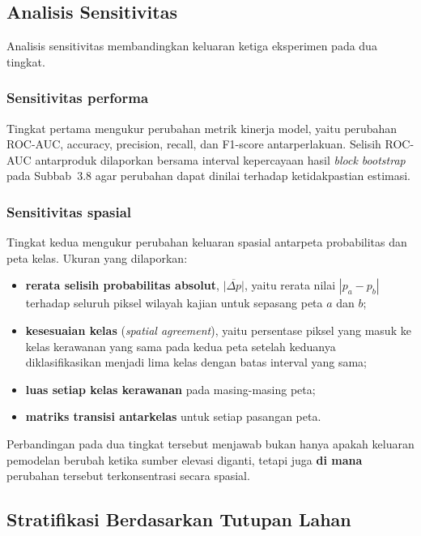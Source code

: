 \documentclass[12pt]{article}
\begin{document}
\subsection{Analisis Sensitivitas}

Analisis sensitivitas membandingkan keluaran ketiga eksperimen pada dua
tingkat.

\subsubsection{Sensitivitas performa}

Tingkat pertama mengukur perubahan metrik kinerja model, yaitu perubahan
ROC-AUC, accuracy, precision, recall, dan F1-score antarperlakuan. Selisih
ROC-AUC antarproduk dilaporkan bersama interval kepercayaan hasil
\textit{block bootstrap} pada Subbab~3.8 agar perubahan dapat dinilai
terhadap ketidakpastian estimasi.

\subsubsection{Sensitivitas spasial}

Tingkat kedua mengukur perubahan keluaran spasial antarpeta probabilitas dan
peta kelas. Ukuran yang dilaporkan:

\begin{itemize}
\item \textbf{rerata selisih probabilitas absolut}, $\overline{|\Delta p|}$,
yaitu rerata nilai $|p_a - p_b|$ terhadap seluruh piksel wilayah kajian
untuk sepasang peta $a$ dan $b$;
\item \textbf{kesesuaian kelas} (\textit{spatial agreement}), yaitu
persentase piksel yang masuk ke kelas kerawanan yang sama pada kedua peta
setelah keduanya diklasifikasikan menjadi lima kelas dengan batas interval
yang sama;
\item \textbf{luas setiap kelas kerawanan} pada masing-masing peta;
\item \textbf{matriks transisi antarkelas} untuk setiap pasangan peta.
\end{itemize}

Perbandingan pada dua tingkat tersebut menjawab bukan hanya apakah keluaran
pemodelan berubah ketika sumber elevasi diganti, tetapi juga
\textbf{di mana} perubahan tersebut terkonsentrasi secara spasial.

\subsection{Stratifikasi Berdasarkan Tutupan Lahan}
\end{document}
